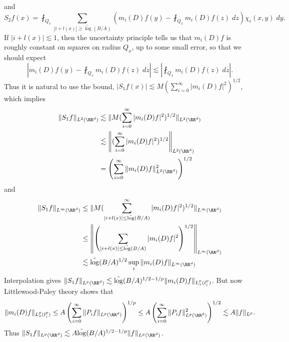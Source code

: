 %
and
%
\[ S_2 f(x) = \fint_{Q_x} \sum_{|i + l(x)| \geq \tilde\log(B/A)} \left( m_i(D) f(y) - \fint_{Q_x} m_i(D) f(z)\; dz \right) \chi_i(x,y)\; dy. \]
%
If $|i + l(x)| \lesssim 1$, then the uncertainty principle tells us that $m_i(D) f$ is roughly constant on squares on radius $Q_x$, up to some small error, so that we should expect
%
\[ \left| m_i(D) f(y) - \fint_{Q_x} m_i(D) f(z)\; dz \right| \lesssim \left| \fint_{Q_x} m_i(D) f(z)\; dz \right|. \]
%
Thus it is natural to use the bound, $|S_1 f(x)| \lesssim M(\sum_{i = 0}^\infty |m_i(D) f|^2)^{1/2}$, which implies
%
\begin{align*}
    \| S_1 f \|_{L^2(\RR^d)} &\lesssim \| M(\sum_{i = 0}^\infty |m_i(D) f|^2)^{1/2} \|_{L^2(\RR^d)}\\
    &\lesssim \left\| (\sum_{i = 0}^\infty |m_i(D) f|^2 )^{1/2} \right\|_{L^2(\RR^d)}\\
    &= \left( \sum_{i = 0}^\infty \| m_i(D) f \|_{L^2(\RR^d)}^2 \right)^{1/2}
\end{align*}
%
and
%
\begin{align*}
    \| S_1 f \|_{L^\infty(\RR^d)} &\leq \| M(\sum_{|i + l(x)| \leq \tilde{\log}(B/A)}^\infty |m_i(D) f|^2)^{1/2} \|_{L^\infty(\RR^d)}\\
    &\leq \left\| \left( \sum_{|i + l(x)| \leq \tilde{\log}(B/A)} |m_i(D) f|^2 \right)^{1/2} \right\|_{L^\infty(\RR^d)}\\
    &\lesssim \tilde{\log}(B/A)^{1/2} \sup_i  \| m_i(D) f \|_{L^\infty(\RR^d)}
\end{align*}
%
Interpolation gives $\| S_1 f \|_{L^p(\RR^d)} \lesssim \tilde{\log}(B/A)^{1/2 - 1/p} \| m_i(D) f \|_{L^p_x(l^p_i)}$. But now Littlewood-Paley theory shows that
%
\[ \| m_i(D) f \|_{L^p_x(l^p_i)} \leq A \left( \sum_{i = 0}^\infty \| P_i f \|_{L^p(\RR^d)} \right)^{1/p} \leq A \left( \sum_{i = 0}^\infty \| P_i f \|_{L^p(\RR^d)}^2 \right)^{1/2} \lesssim A \| f \|_{L^p}. \]
%
Thus $\| S_1 f \|_{L^p(\RR^d)} \lesssim A \tilde{\log}(B/A)^{1/2 - 1/p} \| f \|_{L^p(\RR^d)}$.

